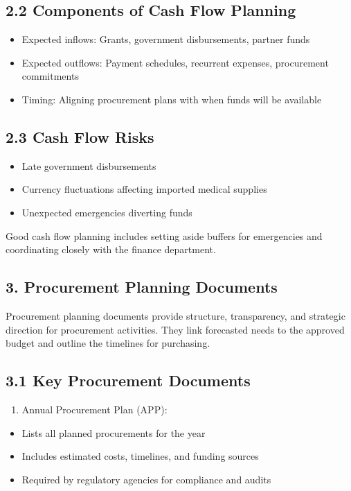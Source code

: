 \documentclass[10pt]{article}
\begin{document}
\subsection*{2.2 Components of Cash Flow Planning}
\begin{itemize}
  \item Expected inflows: Grants, government disbursements, partner funds
  \item Expected outflows: Payment schedules, recurrent expenses, procurement commitments
  \item Timing: Aligning procurement plans with when funds will be available
\end{itemize}

\subsection*{2.3 Cash Flow Risks}
\begin{itemize}
  \item Late government disbursements
  \item Currency fluctuations affecting imported medical supplies
  \item Unexpected emergencies diverting funds
\end{itemize}

Good cash flow planning includes setting aside buffers for emergencies and coordinating closely with the finance department.

\subsection*{3. Procurement Planning Documents}
Procurement planning documents provide structure, transparency, and strategic direction for procurement activities. They link forecasted needs to the approved budget and outline the timelines for purchasing.

\subsection*{3.1 Key Procurement Documents}
\begin{enumerate}
  \item Annual Procurement Plan (APP):
\end{enumerate}

\begin{itemize}
  \item Lists all planned procurements for the year
  \item Includes estimated costs, timelines, and funding sources
  \item Required by regulatory agencies for compliance and audits
\end{itemize}
\end{document}
